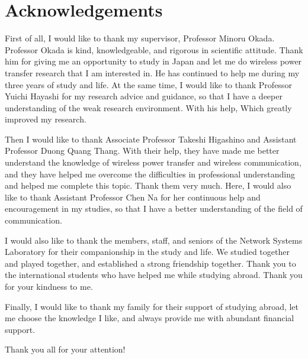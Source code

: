 \chapter*{Acknowledgements}
First of all, I would like to thank my supervisor, Professor Minoru Okada. Professor Okada is kind, knowledgeable, and rigorous in scientific attitude. Thank him for giving me an opportunity to study in Japan and let me do wireless power transfer research that I am interested in. He has continued to help me during my three years of study and life. At the same time, I would like to thank Professor Yuichi Hayashi for my research advice and guidance, so that I have a deeper understanding of the weak research environment. With his help, Which greatly improved my research.

Then I would like to thank Associate Professor Takeshi Higashino and Assistant Professor Duong Quang Thang. With their help, they have made me better understand the knowledge of wireless power transfer and wireless communication, and they have helped me overcome the difficulties in professional understanding and helped me complete this topic. Thank them very much. Here, I would also like to thank Assistant Professor Chen Na for her continuous help and encouragement in my studies, so that I have a better understanding of the field of communication.

I would also like to thank the members, staff, and seniors of the Network Systems Laboratory for their companionship in the study and life. We studied together and played together, and established a strong friendship together. Thank you to the international students who have helped me while studying abroad. Thank you for your kindness to me.

Finally, I would like to thank my family for their support of studying abroad, let me choose the knowledge I like, and always provide me with abundant financial support.

Thank you all for your attention!